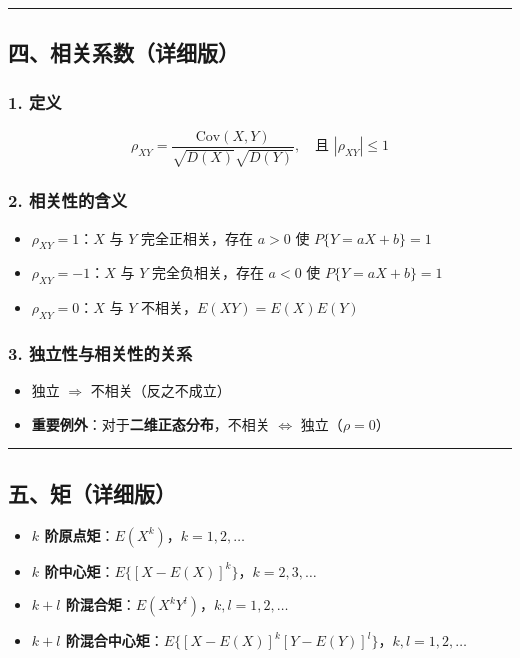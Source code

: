 \documentclass[12pt,a4paper]{ctexart}
\begin{document}
\vspace{1em}\hrule\vspace{1em}

\subsection{四、相关系数（详细版）}

\subsubsection{1. 定义}
\[ \rho_{XY} = \frac{\text{Cov}(X, Y)}{\sqrt{D(X)}\sqrt{D(Y)}}, \quad \text{且 } |\rho_{XY}| \le 1 \]

\subsubsection{2. 相关性的含义}
\begin{itemize}[noitemsep]
    \item $\rho_{XY} = 1$：$X$ 与 $Y$ 完全正相关，存在 $a > 0$ 使 $P\{Y = aX + b\} = 1$
    \item $\rho_{XY} = -1$：$X$ 与 $Y$ 完全负相关，存在 $a < 0$ 使 $P\{Y = aX + b\} = 1$
    \item $\rho_{XY} = 0$：$X$ 与 $Y$ 不相关，$E(XY) = E(X)E(Y)$
\end{itemize}

\subsubsection{3. 独立性与相关性的关系}
\begin{itemize}[noitemsep]
    \item 独立 $\Rightarrow$ 不相关（反之不成立）
    \item \textbf{重要例外}：对于\textbf{二维正态分布}，不相关 $\iff$ 独立（$\rho = 0$）
\end{itemize}

\vspace{1em}\hrule\vspace{1em}

\subsection{五、矩（详细版）}

\begin{itemize}[noitemsep]
    \item \textbf{$k$ 阶原点矩}：$E(X^k)$，$k = 1, 2, \dots$
    \item \textbf{$k$ 阶中心矩}：$E\{[X - E(X)]^k\}$，$k = 2, 3, \dots$
    \item \textbf{$k+l$ 阶混合矩}：$E(X^k Y^l)$，$k, l = 1, 2, \dots$
    \item \textbf{$k+l$ 阶混合中心矩}：$E\{[X - E(X)]^k [Y - E(Y)]^l\}$，$k, l = 1, 2, \dots$
\end{itemize}
\end{document}
